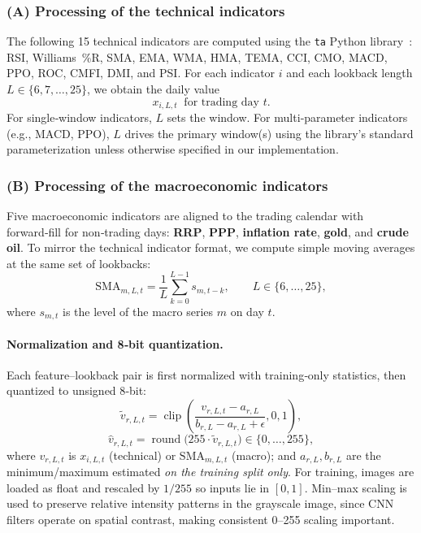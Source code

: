 \documentclass[12pt,a4paper]{article}
\begin{document}
\subsubsection*{(A) Processing of the technical indicators}
The following 15 technical indicators are computed using the \texttt{ta} Python library~\cite{ta-bukosabino}: RSI, Williams~\%R, SMA, EMA, WMA, HMA, TEMA, CCI, CMO, MACD, PPO, ROC, CMFI, DMI, and PSI. For each indicator $i$ and each lookback length $L \in \{6,7,\ldots,25\}$, we obtain the daily value
\[
x_{i,L,t} \;\; \text{for trading day } t.
\]
For single‑window indicators, $L$ sets the window. For multi‑parameter indicators (e.g., MACD, PPO), $L$ drives the primary window(s) using the library's standard parameterization unless otherwise specified in our implementation.

\subsubsection*{(B) Processing of the macroeconomic indicators}
Five macroeconomic indicators are aligned to the trading calendar with forward‑fill for non‑trading days: \textbf{RRP}, \textbf{PPP}, \textbf{inflation rate}, \textbf{gold}, and \textbf{crude oil}. To mirror the technical indicator format, we compute simple moving averages at the same set of lookbacks:
\[
\mathrm{SMA}_{m,L,t} = \frac{1}{L} \sum_{k=0}^{L-1} s_{m,t-k}, \qquad L \in \{6,\ldots,25\},
\]
where $s_{m,t}$ is the level of the macro series $m$ on day $t$.
\paragraph{Normalization and 8‑bit quantization.}
Each feature–lookback pair is first normalized with training‑only statistics, then quantized to unsigned 8‑bit:
\[
\tilde{v}_{r,L,t} = \operatorname{clip}\!\left(\frac{v_{r,L,t} - a_{r,L}}{b_{r,L} - a_{r,L} + \epsilon}, 0, 1\right),
\]
\[
\widehat{v}_{r,L,t} = \operatorname{round}\!\big(255 \cdot \tilde{v}_{r,L,t}\big) \in \{0,\ldots,255\},
\]
where $v_{r,L,t}$ is $x_{i,L,t}$ (technical) or $\mathrm{SMA}_{m,L,t}$ (macro); and $a_{r,L}, b_{r,L}$ are the minimum/maximum estimated \emph{on the training split only}. For training, images are loaded as float and rescaled by $1/255$ so inputs lie in $[0,1]$. Min–max scaling is used to preserve relative intensity patterns in the grayscale image, since CNN filters operate on spatial contrast, making consistent 0–255 scaling important.
\end{document}

